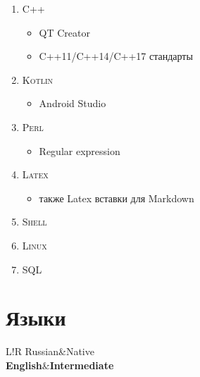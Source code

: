 \documentclass[]{report}
\newcommand\VRule{\color{lightgray}\vrule width 0.5pt}
\begin{document}
\begin{enumerate}

\item {
	\textsc{C++}
	\begin{itemize}
		\item {QT Creator}
		\item {C++11/C++14/C++17 стандарты}
	\end{itemize}
}

\item {
	\textsc{Kotlin}
	\begin{itemize}
		\item {Android Studio}
	\end{itemize}
}

\item {\textsc{Perl}
	\begin{itemize}
		\item {Regular expression}
	\end{itemize}
}

\item {
	\textsc{Latex}
	\begin{itemize}
		\item {также Latex вставки для Markdown}   
	\end{itemize}	   		
}

\item {\textsc{Shell}}

\item {\textsc{Linux}}

\item {\textsc{SQL}}

\end{enumerate}


\section*{\Large Языки}
\begin{tabular}{L!{\VRule}R}
Russian&Native\\
{\bf English}&{\bf Intermediate}
\end{tabular}
\end{document}
